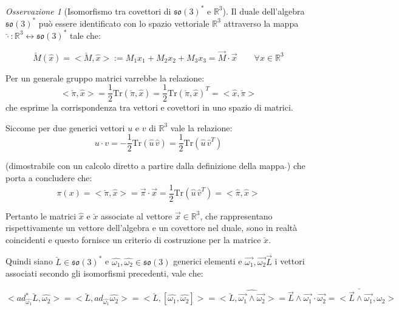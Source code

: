 \documentclass[11pt]{report}
\theoremstyle{plain}
\theoremstyle{definition}
\theoremstyle{remark}
\newtheorem{oss}{Osservazione}
\begin{document}
\begin{oss}[Isomorfismo tra covettori di $\mathfrak{so(3)}^{\ast}$ e $\mathbb{R}^{3}$]
Il duale dell'algebra $\mathfrak{so(3)}^{\ast}$ può essere identificato con lo spazio vettoriale $\mathbb{R}^{3}$ attraverso la mappa $\breve{\cdot} : \mathbb{R}^{3} \longleftrightarrow \mathfrak{so(3)}^{\ast}$ tale che:

\begin{equation}
\breve{M} ( \widehat{x}) = < \breve{M} , \widehat{x} > := M_{1}x_{1} + M_{2}x_{2} + M_{3}x_{3} = \vec{M} \cdot \vec{x} \qquad \forall x \in \mathbb{R}^{3} 
\end{equation}

Per un generale gruppo matrici varrebbe la relazione:
$$<\breve{\pi} , \hat{x} > = \dfrac{1}{2}\textrm{Tr}(\breve{\pi},\hat{x}) = \dfrac{1}{2}\textrm{Tr}(\breve{\pi},\hat{x})^{T} = <\hat{x} , \breve{\pi} >  $$
che esprime la corrispondenza tra vettori e covettori in uno spazio di matrici.

Siccome per due generici vettori $u$ e $v$ di $\mathbb{R}^{3}$ vale la relazione:
\begin{displaymath}
u \cdot v = -\frac{1}{2}\textrm{Tr}(\hat{u}\,\hat{v}) = \dfrac{1}{2}\textrm{Tr}(\hat{u}\,\hat{v}^{T})
\end{displaymath}

(dimostrabile con un calcolo diretto a partire dalla definizione della mappa $\widehat{}$) che porta a concludere che:
\begin{displaymath}
\pi ( x) = < \breve{\pi}, \hat{x}> = \vec{\pi}\cdot \vec{x} = \dfrac{1}{2}\textrm{Tr}(\hat{u}\,\hat{v}^{T}) = < \hat{\pi},\hat{x}>
\end{displaymath}

Pertanto le matrici $\hat{x}$ e $\breve{x}$ associate al vettore $\vec{x} \in \mathbb{R}^{3}$, che rappresentano rispettivamente un vettore dell'algebra e un covettore nel duale, sono in realtà coincidenti e questo fornisce un criterio di costruzione per la matrice $\breve{x}$.
\end{oss}

Quindi siano $ \breve{L} \in \mathfrak{so(3)}^{\ast}$ e $\hat{\omega_{1}} , \hat{\omega_{2}} \in \mathfrak{so(3)}$ generici elementi e $\vec{\omega_{1}},\vec{\omega_{2}}\vec{L}$ i vettori associati secondo gli isomorfismi precedenti, vale che:

\begin{displaymath}
< ad_{\hat{\omega_{1}}}^{\ast} \breve{L} , \hat{\omega_{2}} > = < \breve{L}, ad_{\hat{\omega_{1}}} \hat{\omega_{2}}> = <\breve{L},[\hat{\omega_{1}},\hat{\omega_{2}}]> = <\breve{L}, \widehat{\vec{\omega_{1}} \wedge \vec{\omega_{2}}} > = \vec{L} \wedge \vec{\omega_{1}} \cdot \vec{\omega_{2}} = < \breve{\vec{L} \wedge \vec{\omega_{1}}}, \omega_{2}>
\end{displaymath}
\end{document}
